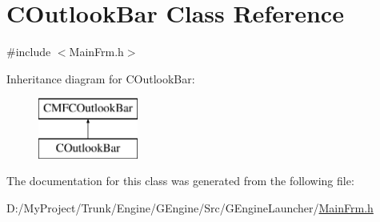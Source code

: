 \hypertarget{class_c_outlook_bar}{}\section{C\+Outlook\+Bar Class Reference}
\label{class_c_outlook_bar}


{\ttfamily \#include $<$Main\+Frm.\+h$>$}

Inheritance diagram for C\+Outlook\+Bar\+:\begin{figure}[H]
\begin{center}
\leavevmode
\includegraphics[height=2.000000cm]{class_c_outlook_bar}
\end{center}
\end{figure}


The documentation for this class was generated from the following file\+:\begin{DoxyCompactItemize}
\item 
D\+:/\+My\+Project/\+Trunk/\+Engine/\+G\+Engine/\+Src/\+G\+Engine\+Launcher/\hyperlink{_g_engine_launcher_2_main_frm_8h}{Main\+Frm.\+h}\end{DoxyCompactItemize}
